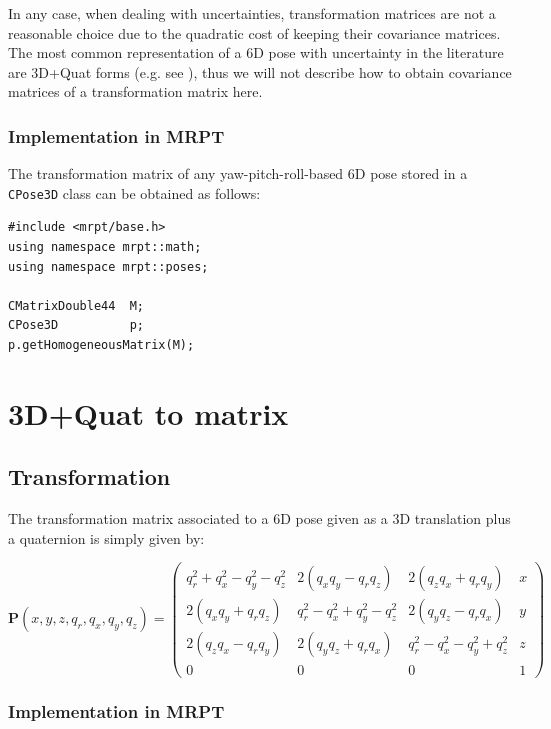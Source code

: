 \documentclass[a4paper,10pt]{report}
\begin{document}
In any case, when dealing with uncertainties, transformation matrices are not a 
reasonable choice due to the 
quadratic cost of keeping their covariance matrices. 
The most common representation of a 6D pose with uncertainty in the literature 
are 3D+Quat forms (e.g. see \cite{davison2007mrt}), thus 
we will not describe how to 
obtain covariance matrices of a transformation matrix here.


\subsubsection{Implementation in MRPT}

The transformation matrix of any yaw-pitch-roll-based 6D pose stored in a 
\texttt{CPose3D} class can be obtained as follows:

\begin{lstlisting}
#include <mrpt/base.h> 
using namespace mrpt::math; 
using namespace mrpt::poses; 

CMatrixDouble44  M;
CPose3D          p;
p.getHomogeneousMatrix(M);
\end{lstlisting}


\section{3D+Quat to matrix }
\label{sect:quat2mat}

\subsection{Transformation}

The transformation matrix associated to a 6D pose given as a 3D translation plus 
a quaternion is simply given by:

\begin{equation}
\mathbf{P}(x,y,z,q_r,q_x,q_y,q_z)=\left(
  \begin{array}{ccc|c}
   q_r^2+q_x^2-q_y^2-q_z^2 	&  2(q_x q_y - q_r q_z)	&  	2(q_z q_x+q_r q_y)  & x \\
   2(q_x q_y+q_r q_z) 		& q_r^2-q_x^2+q_y^2-q_z^2 	& 2(q_y q_z-q_r q_x) 	& y \\
   2(q_z q_x-q_r q_y) & 2(q_y q_z+q_r q_x)  & q_r^2- q_x^2 - q_y^2 + q_z^2 & z \\ \hline
   0 & 0 & 0& 1
  \end{array}
\right)
\end{equation}



\subsubsection{Implementation in MRPT}
\end{document}
